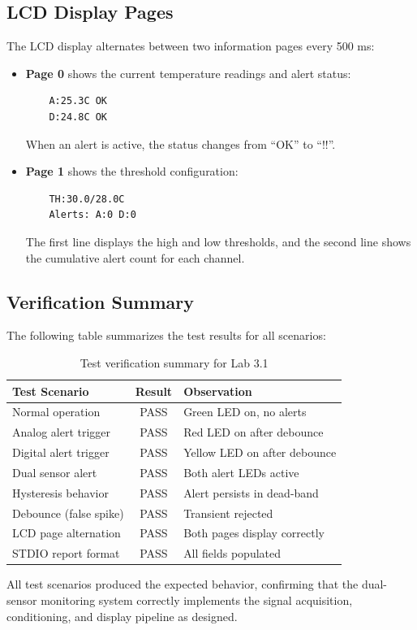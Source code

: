 \subsection{LCD Display Pages}

The LCD display alternates between two information pages every 500 ms:

\begin{itemize}
    \item \textbf{Page 0} shows the current temperature readings and alert status:
    \begin{verbatim}
    A:25.3C OK
    D:24.8C OK
    \end{verbatim}
    When an alert is active, the status changes from ``OK'' to ``!!''.

    \item \textbf{Page 1} shows the threshold configuration:
    \begin{verbatim}
    TH:30.0/28.0C
    Alerts: A:0 D:0
    \end{verbatim}
    The first line displays the high and low thresholds, and the second line shows the cumulative alert count for each channel.
\end{itemize}

\subsection{Verification Summary}

The following table summarizes the test results for all scenarios:

\begin{table}[H]
\centering
\begin{tabular}{|l|c|l|}
\hline
\textbf{Test Scenario} & \textbf{Result} & \textbf{Observation} \\
\hline
Normal operation         & PASS & Green LED on, no alerts \\
Analog alert trigger     & PASS & Red LED on after debounce \\
Digital alert trigger    & PASS & Yellow LED on after debounce \\
Dual sensor alert        & PASS & Both alert LEDs active \\
Hysteresis behavior      & PASS & Alert persists in dead-band \\
Debounce (false spike)   & PASS & Transient rejected \\
LCD page alternation     & PASS & Both pages display correctly \\
STDIO report format      & PASS & All fields populated \\
\hline
\end{tabular}
\caption{Test verification summary for Lab 3.1}
\label{tab:test_summary}
\end{table}

All test scenarios produced the expected behavior, confirming that the dual-sensor monitoring system correctly implements the signal acquisition, conditioning, and display pipeline as designed.
